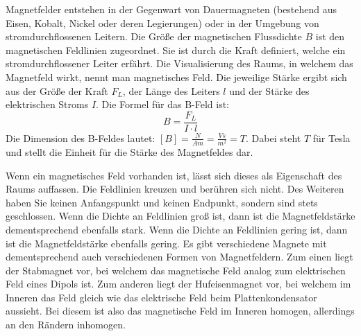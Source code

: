 Magnetfelder entstehen in der Gegenwart von Dauermagneten (bestehend aus Eisen, Kobalt, Nickel oder deren Legierungen) oder in der Umgebung von stromdurchflossenen Leitern. 
Die Größe der magnetischen Flussdichte $B$ ist den magnetischen Feldlinien zugeordnet.
Sie ist durch die Kraft definiert, welche ein stromdurchflossener Leiter erfährt.
Die Visualisierung des Raums, in welchem das Magnetfeld wirkt, nennt man magnetisches Feld.
Die jeweilige Stärke ergibt sich aus der Größe der Kraft $F_L$, der Länge des Leiters $l$ und der Stärke des elektrischen Stroms $I$.
Die Formel für das B-Feld ist:
\begin{equation*}
    B = \frac{F_L}{I \cdot l}
\end{equation*}
Die Dimension des B-Feldes lautet: $[B] = \frac{N}{Am} = \frac{Vs}{m^2} = T$.
Dabei steht $T$ für Tesla und stellt die Einheit für die Stärke des Magnetfeldes dar.

Wenn ein magnetisches Feld vorhanden ist, lässt sich dieses als Eigenschaft des Raums auffassen.
Die Feldlinien kreuzen und berühren sich nicht.
Des Weiteren haben Sie keinen Anfangspunkt und keinen Endpunkt, sondern sind stets geschlossen.
Wenn die Dichte an Feldlinien groß ist, dann ist die Magnetfeldstärke dementsprechend ebenfalls stark.
Wenn die Dichte an Feldlinien gering ist, dann ist die Magnetfeldstärke ebenfalls gering.
Es gibt verschiedene Magnete mit dementsprechend auch verschiedenen Formen von Magnetfeldern. 
Zum einen liegt der Stabmagnet vor, bei welchem das magnetische Feld analog zum elektrischen Feld eines Dipols ist.
Zum anderen liegt der Hufeisenmagnet vor, bei welchem im Inneren das Feld gleich wie das elektrische Feld beim Plattenkondensator aussieht.
Bei diesem ist also das magnetische Feld im Inneren homogen, allerdings an den Rändern inhomogen. 

